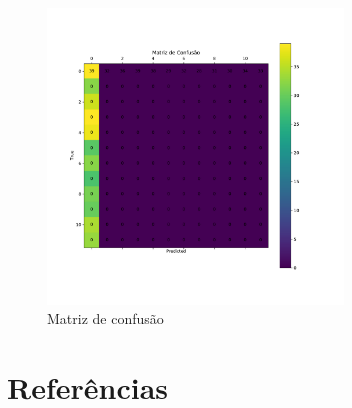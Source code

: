\documentclass[12pt,
	english,			%
	french,				%
	spanish,			%
	brazil,				%
	]{article}
\begin{document}
\clearpage

\begin{figure}[!htb]
\centering
\includegraphics[width=0.7\textwidth]{images/cm_svm_rbf.pdf}
\caption{\label{fig:cm_svm_rfb}Matriz de confusão}
\end{figure}

\section{Referências}



\end{document}
